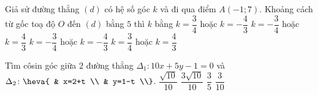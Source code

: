 \begin{ex}%
	Giả sử đường thẳng $(d)$ có hệ số góc $k$ và đi qua điểm $A\left(-1;7\right).$ Khoảng cách từ gốc toạ độ $O$ đến $(d)$ bằng $5$ thì $k$ bằng
	\choice
	{$k=\dfrac{3}{4}$ hoặc $k=-\dfrac{4}{3}$}
	{\True $k=-\dfrac{3}{4}$ hoặc $k=\dfrac{4}{3}$}
	{$k=-\dfrac{3}{4}$ hoặc $k=-\dfrac{4}{3}$}
	{$k=\dfrac{3}{4}$ hoặc $k=\dfrac{4}{3}$}
\end{ex}
\begin{ex}%
	Tìm côsin góc giữa $2$ đường thẳng $\Delta_1\colon 10x+5y-1=0$ và ${\Delta}_2\colon\heva{
		& x=2+t \\ 
		& y=1-t \\}$.
	\choice
	{$\dfrac{\sqrt{10}}{10}$}
	{\True $\dfrac{3\sqrt{10}}{10}$}
	{$\dfrac{3}{5}$}
	{$\dfrac{3}{10}$}
\end{ex}

